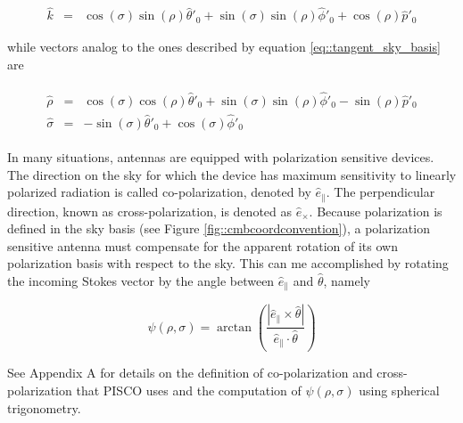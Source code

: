 \documentclass[a4paper,11pt]{article}
\newcommand{\co}{\mathbin{\|}}
\newcommand{\cx}{\mathbin{\times}}
\begin{document}
\begin{equation}
\begin{aligned}
\hat{k}       &=&  \cos(\sigma)\sin(\rho)\hat{\theta}'_0 + \sin(\sigma)\sin(\rho) \hat{\phi}'_0 + \cos(\rho) \hat{p}'_0 
\end{aligned}
\end{equation}

\noindent
while vectors analog to the ones described by equation \ref{eq::tangent_sky_basis} are

\begin{eqnarray}
\begin{aligned}
\hat{\rho}    &=&  \cos(\sigma)\cos(\rho)\hat{\theta}'_0 + \sin(\sigma)\sin(\rho) \hat{\phi}'_0 - \sin(\rho) \hat{p}'_0 \\
\hat{\sigma}  &=& -\sin(\sigma)\hat{\theta}'_0 + \cos(\sigma)\hat{\phi}'_0
\end{aligned}
\end{eqnarray}

In many situations, antennas are equipped with polarization sensitive devices. The direction on the sky for which the device has maximum sensitivity to linearly polarized radiation is called co-polarization, denoted by $\hat{e}_{\co}$. The perpendicular direction, known as cross-polarization, is denoted as $\hat{e}_{\cx}$.
Because polarization is defined in the sky basis (see Figure \ref{fig::cmbcoordconvention}), a polarization sensitive antenna must compensate for the apparent rotation of its own polarization basis with respect to the sky. This can me accomplished by rotating the incoming Stokes vector by the angle between $\hat{e}_{\co}$ and $\hat{\theta}$, namely

\begin{equation}
\psi(\rho,\sigma) = \arctan \left( \frac{ |\hat{e}_{\co} \times \hat{\theta}| }{ \hat{e}_{\co} \cdot \hat{\theta} } \right)
\label{eq::psi}
\end{equation}

See Appendix A for details on the definition of co-polarization and cross-polarization that PISCO uses and the computation of $\psi(\rho,\sigma)$ using spherical trigonometry.
\end{document}
